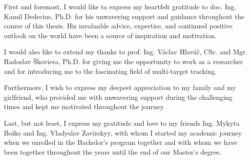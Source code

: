 \begin{acknowledgmentpage}
	First and foremost, I would like to express my heartfelt gratitude to doc. Ing. Kamil Dedecius, Ph.D. for his unwavering support and guidance throughout the course of this thesis. His invaluable advice, expertise, and continued positive outlook on the world have been a source of inspiration and motivation.

    I would also like to extend my thanks to prof. Ing. Václav Hlaváč, CSc. and Mgr. Radoslav Škoviera, Ph.D. for giving me the opportunity to work as a researcher and for introducing me to the fascinating field of multi-target tracking.

    Furthermore, I wish to express my deepest appreciation to my family and my girlfriend, who provided me with unwavering support during the challenging times and kept me motivated throughout the journey.

    Last, but not least, I express my gratitude and love to my friends Ing. Mykyta Boiko and Ing. Vladyslav Zavirskyy, with whom I started my academic journey when we enrolled in the Bachelor's program together and with whom we have been together throughout the years until the end of our Master's degree.
\end{acknowledgmentpage}
